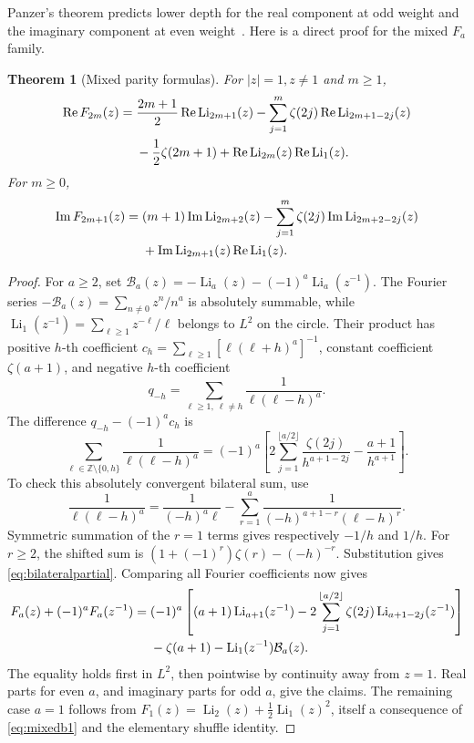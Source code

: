 \documentclass[11pt]{article}
\newtheorem{theorem}{Theorem}[section]
\theoremstyle{definition}
\theoremstyle{remark}
\newcommand{\Li}{\operatorname{Li}}
\newcommand{\Z}{\mathbb{Z}}
\newcommand{\Repart}{\operatorname{Re}}
\newcommand{\Impart}{\operatorname{Im}}
\begin{document}
Panzer's theorem predicts lower depth for the real component at odd
weight and the imaginary component at even weight~\cite{Panzer}.
Here is a direct proof for the mixed \(F_a\) family.

\begin{theorem}[Mixed parity formulas]\label{thm:mixedparity}
For \(|z|=1,z\ne1\) and \(m\ge1\),
\begin{align}
\Repart F_{2m}(z)
={}&\frac{2m+1}{2}\Repart\Li_{2m+1}(z)
 -\sum_{j=1}^{m}\zeta(2j)\Repart\Li_{2m+1-2j}(z)\notag\\
&-\frac12\zeta(2m+1)
 +\Repart\Li_{2m}(z)\Repart\Li_1(z).
\label{eq:realparity}
\end{align}
For \(m\ge0\),
\begin{align}
\Impart F_{2m+1}(z)
={}&(m+1)\Impart\Li_{2m+2}(z)
 -\sum_{j=1}^{m}\zeta(2j)\Impart\Li_{2m+2-2j}(z)\notag\\
&+\Impart\Li_{2m+1}(z)\Repart\Li_1(z).
\label{eq:imagparity}
\end{align}
\end{theorem}
\begin{proof}
For \(a\ge2\), set
\(\mathcal B_a(z)=-\Li_a(z)-(-1)^a\Li_a(z^{-1})\).
The Fourier series
\(-\mathcal B_a(z)=\sum_{n\ne0}z^n/n^a\) is absolutely summable,
while \(\Li_1(z^{-1})=\sum_{\ell\ge1}z^{-\ell}/\ell\) belongs to
\(L^2\) on the circle. Their product has positive \(h\)-th coefficient
\(c_h=\sum_{\ell\ge1}[\ell(\ell+h)^a]^{-1}\), constant coefficient
\(\zeta(a+1)\), and negative \(h\)-th coefficient
\[
q_{-h}=\sum_{\ell\ge1,\ \ell\ne h}\frac1{\ell(\ell-h)^a}.
\]
The difference \(q_{-h}-(-1)^a c_h\) is
\begin{equation}
\sum_{\ell\in\Z\setminus\{0,h\}}\frac1{\ell(\ell-h)^a}
=(-1)^a\left[
 2\sum_{j=1}^{\lfloor a/2\rfloor}
       \frac{\zeta(2j)}{h^{a+1-2j}}
 -\frac{a+1}{h^{a+1}}\right].
\label{eq:bilateralpartial}
\end{equation}
To check this absolutely convergent bilateral sum, use
\[
\frac1{\ell(\ell-h)^a}
=\frac1{(-h)^a\ell}
 -\sum_{r=1}^{a}\frac1{(-h)^{a+1-r}(\ell-h)^r}.
\]
Symmetric summation of the \(r=1\) terms gives respectively
\(-1/h\) and \(1/h\). For \(r\ge2\), the shifted sum is
\((1+(-1)^r)\zeta(r)-(-h)^{-r}\). Substitution gives
\eqref{eq:bilateralpartial}.
Comparing all Fourier coefficients now gives
\begin{align}
F_a(z)+(-1)^aF_a(z^{-1})
={}&(-1)^a\left[(a+1)\Li_{a+1}(z^{-1})
 -2\sum_{j=1}^{\lfloor a/2\rfloor}
       \zeta(2j)\Li_{a+1-2j}(z^{-1})\right]\notag\\
&-\zeta(a+1)-\Li_1(z^{-1})\mathcal B_a(z).
\label{eq:mixedfourier}
\end{align}
The equality holds first in \(L^2\), then pointwise by continuity away
from \(z=1\). Real parts for even \(a\), and imaginary parts for odd
\(a\), give the claims. The remaining case \(a=1\) follows from
\(F_1(z)=\Li_2(z)+\tfrac12\Li_1(z)^2\), itself a consequence of
\eqref{eq:mixedb1} and the elementary shuffle identity.
\end{proof}
\end{document}

